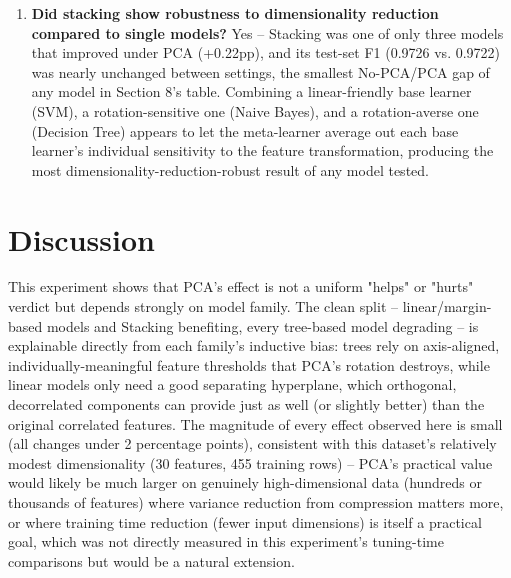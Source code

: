 \documentclass[12pt,a4paper]{article}
\begin{document}
\begin{enumerate}
Boosting, XGBoost) were uniformly PCA-averse, each losing between 0.2 and 1.5 percentage
points of CV accuracy. This is a clean, consistent split along model family lines, not
scattered across both groups.
\item \textbf{Did stacking show robustness to dimensionality reduction compared to single
models?} Yes -- Stacking was one of only three models that improved under PCA (+0.22pp), and
its test-set F1 (0.9726 vs. 0.9722) was nearly unchanged between settings, the smallest
No-PCA/PCA gap of any model in Section 8's table. Combining a linear-friendly base learner
(SVM), a rotation-sensitive one (Naive Bayes), and a rotation-averse one (Decision Tree)
appears to let the meta-learner average out each base learner's individual sensitivity to the
feature transformation, producing the most dimensionality-reduction-robust result of any
model tested.
\end{enumerate}

\section{Discussion}
This experiment shows that PCA's effect is not a uniform "helps" or "hurts" verdict but
depends strongly on model family. The clean split -- linear/margin-based models and Stacking
benefiting, every tree-based model degrading -- is explainable directly from each family's
inductive bias: trees rely on axis-aligned, individually-meaningful feature thresholds that
PCA's rotation destroys, while linear models only need a good separating hyperplane, which
orthogonal, decorrelated components can provide just as well (or slightly better) than the
original correlated features. The magnitude of every effect observed here is small (all
changes under 2 percentage points), consistent with this dataset's relatively modest
dimensionality (30 features, 455 training rows) -- PCA's practical value would likely be much
larger on genuinely high-dimensional data (hundreds or thousands of features) where variance
reduction from compression matters more, or where training time reduction (fewer input
dimensions) is itself a practical goal, which was not directly measured in this experiment's
tuning-time comparisons but would be a natural extension.
\end{document}
